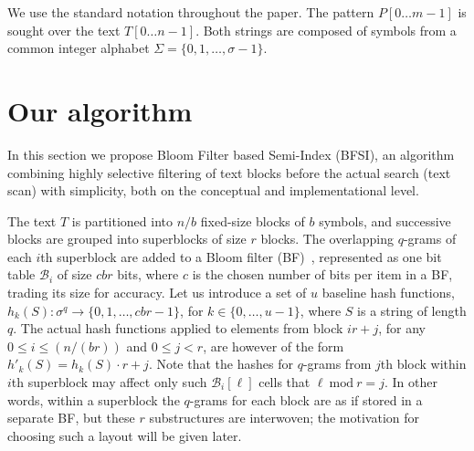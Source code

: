 \documentclass{llncs}
\begin{document}
We use the standard notation throughout the paper. 
The pattern $P[0 \ldots m-1]$ is sought over the text $T[0 \ldots n-1]$.
Both strings are composed of symbols from a common integer alphabet 
$\Sigma = \{0, 1, \ldots, \sigma - 1\}$.

\section{Our algorithm}
\label{sec:alg1}

In this section we propose Bloom Filter based Semi-Index (BFSI), 
an algorithm combining highly selective filtering of text blocks 
before the actual search (text scan) 
with simplicity, 
both on the conceptual and implementational level.

The text $T$ is partitioned into $n/b$ fixed-size blocks of $b$ symbols, 
and successive blocks are grouped into superblocks of size $r$ blocks.
The overlapping $q$-grams of each $i$th superblock are added to a 
Bloom filter (BF)~\cite{Bloom1970}, 
represented as one bit table $\mathcal{B}_i$ of size $cbr$ bits, 
where $c$ is the chosen number of bits per item in a BF, 
trading its size for accuracy.
Let us introduce a set of $u$ baseline hash functions, 
$h_k(S): \sigma^q \to \{0, 1, \ldots, cbr-1\}$, 
for $k \in \{0, \ldots, u-1\}$, where $S$ is a string of length $q$.
The actual hash functions applied to elements from block 
$ir+j$, for any $0 \leq i \leq (n/(br))$ and $0 \leq j < r$, 
are however of the form $h'_k(S) = h_k(S) \cdot r + j$.
Note that the hashes for $q$-grams from $j$th block within $i$th superblock 
may affect only such $\mathcal{B}_i[\ell]$ cells that $\ell\ \text{mod}\ r = j$.
In other words, within a superblock the $q$-grams for each block 
are as if stored in a separate BF, 
but these $r$ substructures are interwoven; 
the motivation for choosing such a layout will be given later.
\end{document}
